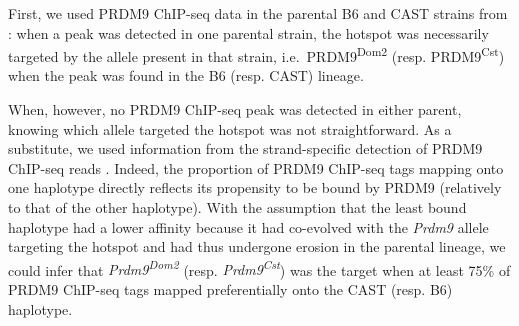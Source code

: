 First, we used PRDM9 ChIP-seq data in the parental B6 and CAST strains from \citet{baker2015prdm9}: 
when a peak was detected in one parental strain, the hotspot was necessarily targeted by the allele present in that strain, i.e.\ PRDM9\textsuperscript{Dom2} (resp. PRDM9\textsuperscript{Cst}) when the peak was found in the B6 (resp. CAST) lineage.

%

When, however, no PRDM9 ChIP-seq peak was detected in either parent, knowing which allele targeted the hotspot was not straightforward.
As a substitute, we used information from the strand-specific detection of PRDM9 ChIP-seq reads \citep{baker2015prdm9}.
Indeed, the proportion of PRDM9 ChIP-seq tags mapping onto one haplotype directly reflects its propensity to be bound by PRDM9 (relatively to that of the other haplotype).
With the assumption that the least bound haplotype had a lower affinity because it had co-evolved with the \textit{Prdm9} allele targeting the hotspot and had thus undergone erosion in the parental lineage, we could infer that \textit{Prdm9\textsuperscript{Dom2}} (resp. \textit{Prdm9\textsuperscript{Cst}}) was the target when at least 75\% of PRDM9 ChIP-seq tags mapped preferentially onto the CAST (resp. B6) haplotype.


